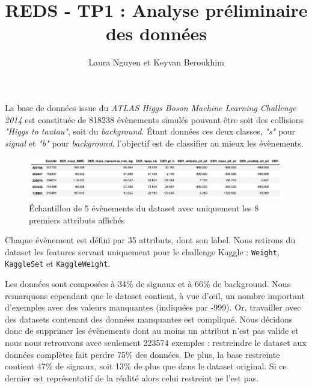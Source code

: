 \documentclass[12pt]{article}
\begin{document}
\title{REDS - TP1 : Analyse préliminaire des données}
\author{Laura Nguyen et Keyvan Beroukhim}
\maketitle

La base de données issue du \emph{ATLAS Higgs Boson Machine Learning Challenge
2014} est constituée de 818238 évènements simulés pouvant être soit des
collisions \emph{"Higgs to tautau"}, soit du \emph{background}. Étant données
ces deux classes, \emph{"s"} pour \emph{signal} et \emph{"b"} pour
\emph{background}, l'objectif est de classifier au mieux les évènements.

\begin{figure}[H]
    \center 
    \includegraphics[width=\textwidth]{images/dataset_sample.png}
    \caption{Échantillon de 5 évènements du dataset avec uniquement les 8
    premiers attributs affichés}
\end{figure}

Chaque évènement est défini par 35 attributs, dont son label. Nous retirons du
dataset les features servant uniquement pour le challenge Kaggle :
\texttt{Weight}, \texttt{KaggleSet} et \texttt{KaggleWeight}.

Les données sont composées à 34\% de signaux et à 66\% de background. Nous
remarquons cependant que le dataset contient, à vue d'œil, un nombre important
d'exemples avec des valeurs manquantes (indiquées par -999). Or, travailler avec
des datasets contenant des données manquantes est compliqué. Nous décidons donc
de supprimer les évènements dont au moins un attribut n'est pas valide et nous
nous retrouvons avec seulement 223574 exemples : restreindre le dataset aux
données complètes fait perdre 75\% des données. De plus, la base restreinte
contient 47\% de signaux, soit 13\% de plus que dans le dataset original. Si ce
dernier est représentatif de la réalité alors celui restreint ne l'est pas.
\end{document}
